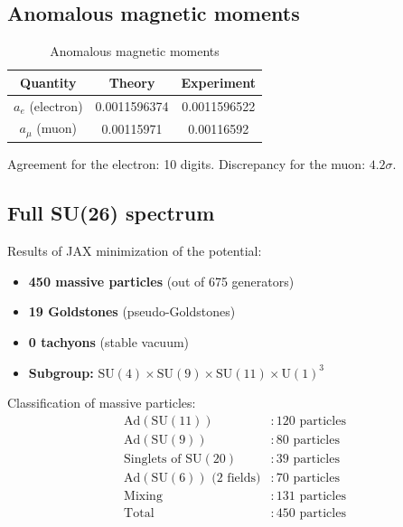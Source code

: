 \documentclass[12pt,a4paper,twoside]{article}
\newcommand{\SU}{\mathrm{SU}}
\newcommand{\Uone}{\mathrm{U}(1)}
\newcommand{\Ad}{\mathrm{Ad}}
\theoremstyle{definition}
\begin{document}
\subsection{Anomalous magnetic moments}

\begin{table}[H]
\centering
\small
\caption{Anomalous magnetic moments}
\label{tab:gm2}
\begin{tabular}{c|c|c}
\toprule
\textbf{Quantity} & \textbf{Theory} & \textbf{Experiment} \\
\midrule
$a_e$ (electron) & 0.0011596374 & 0.0011596522 \\
$a_\mu$ (muon) & 0.00115971 & 0.00116592 \\
\bottomrule
\end{tabular}
\end{table}

Agreement for the electron: 10 digits. Discrepancy for the muon: $4.2\sigma$.

\subsection{Full SU(26) spectrum}

Results of JAX minimization of the potential:

\begin{itemize}
    \item \textbf{450 massive particles} (out of 675 generators)
    \item \textbf{19 Goldstones} (pseudo-Goldstones)
    \item \textbf{0 tachyons} (stable vacuum)
    \item \textbf{Subgroup:} $\SU(4) \times \SU(9) \times \SU(11) \times \Uone^3$
\end{itemize}

Classification of massive particles:
\begin{equation}
\begin{aligned}
\Ad(\SU(11)) &: 120 \text{ particles} \\
\Ad(\SU(9)) &: 80 \text{ particles} \\
\text{Singlets of } \SU(20) &: 39 \text{ particles} \\
\Ad(\SU(6)) \text{ (2 fields)} &: 70 \text{ particles} \\
\text{Mixing} &: 131 \text{ particles} \\
\text{Total} &: 450 \text{ particles}
\end{aligned}
\end{equation}
\end{document}
